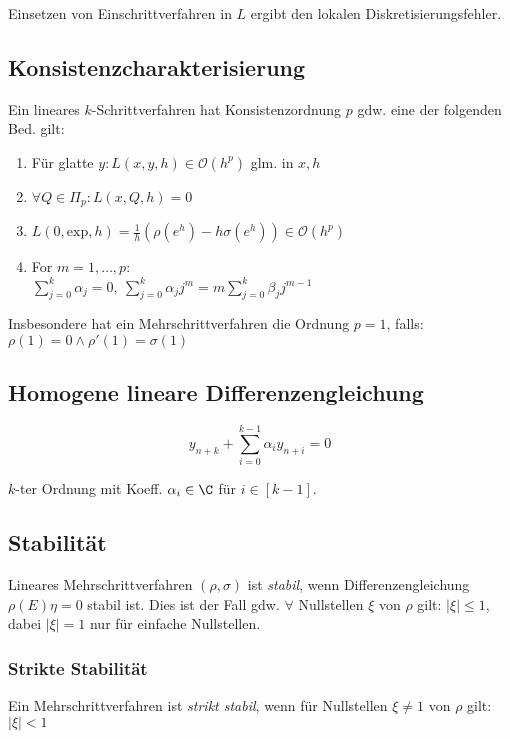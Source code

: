 Einsetzen von Einschrittverfahren in $L$ ergibt den lokalen Diskretisierungsfehler.

\subsection*{Konsistenzcharakterisierung}

Ein lineares $k$-Schrittverfahren hat Konsistenzordnung $p$ gdw. eine der folgenden Bed. gilt:

\begin{enumerate}[label=(\alph*)]
\item Für glatte $y: L(x,y,h) \in \mathcal{O}(h^p)$ glm. in $x, h$
\item $\forall Q \in \Pi_p : L(x,Q,h) = 0$
\item $L(0,\text{exp},h) = \frac{1}{h}(\rho(e^h)-h\sigma(e^h)) \in \mathcal{O}(h^p)$
\item For $m = 1, \dots, p$: \\ $\sum_{j=0}^k \alpha_j = 0, \ \sum_{j=0}^k \alpha_j j^m = m \sum_{j=0}^k \beta_j j^{m-1}$
\end{enumerate}

Insbesondere hat ein Mehrschrittverfahren die Ordnung $p=1$, falls: $\rho(1) = 0 \land \rho'(1) = \sigma(1)$

\subsection*{Homogene lineare Differenzengleichung}

\[ y_{n+k} + \sum_{i=0}^{k-1} \alpha_{i} y_{n+i} = 0 \]

$k$-ter Ordnung mit Koeff. $\alpha_i \in \C$ für $i \in [k-1]$.

\subsection*{Stabilität}

Lineares Mehrschrittverfahren $(\rho,\sigma)$ ist \emph{stabil}, wenn Differenzengleichung $\rho(E)\eta=0$ stabil ist. Dies ist der Fall gdw. $\forall$ Nullstellen $\xi$ von $\rho$ gilt: $|\xi| \leq 1$, dabei $|\xi|=1$ nur für einfache Nullstellen.

\subsubsection*{Strikte Stabilität}

Ein Mehrschrittverfahren ist \emph{strikt stabil}, wenn für Nullstellen $\xi \neq 1$ von $\rho$ gilt: $|\xi| < 1$

